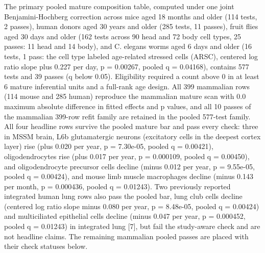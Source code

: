 \documentclass[11pt]{article}
\begin{document}
The primary pooled mature composition table, computed under one joint Benjamini-Hochberg correction across mice aged 18 months and older (114 tests, 2 passes), human donors aged 30 years and older (285 tests, 11 passes), fruit flies aged 30 days and older (162 tests across 90 head and 72 body cell types, 25 passes: 11 head and 14 body), and C. elegans worms aged 6 days and older (16 tests, 1 pass: the cell type labeled age-related stressed cells (ARSC), centered log ratio slope plus 0.227 per day, p = 0.00267, pooled q = 0.04168), contains 577 tests and 39 passes (q below 0.05). Eligibility required a count above 0 in at least 6 mature inferential units and a full-rank age design. All 399 mammalian rows (114 mouse and 285 human) reproduce the mammalian mature scan with 0.0 maximum absolute difference in fitted effects and p values, and all 10 passes of the mammalian 399-row refit family are retained in the pooled 577-test family. All four headline rows survive the pooled mature bar and pass every check: three in MSSM brain, L6b glutamatergic neurons (excitatory cells in the deepest cortex layer) rise (plus 0.020 per year, p = 7.30e-05, pooled q = 0.00421), oligodendrocytes rise (plus 0.017 per year, p = 0.000109, pooled q = 0.00450), and oligodendrocyte precursor cells decline (minus 0.012 per year, p = 9.55e-05, pooled q = 0.00424), and mouse limb muscle macrophages decline (minus 0.143 per month, p = 0.000436, pooled q = 0.01243). Two previously reported integrated human lung rows also pass the pooled bar, lung club cells decline (centered log ratio slope minus 0.080 per year, p = 8.48e-05, pooled q = 0.00424) and multiciliated epithelial cells decline (minus 0.047 per year, p = 0.000452, pooled q = 0.01243) in integrated lung [7], but fail the study-aware check and are not headline claims. The remaining mammalian pooled passes are placed with their check statuses below.
\end{document}
